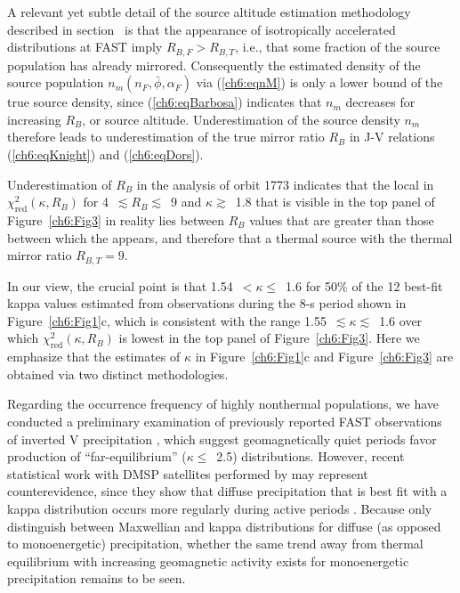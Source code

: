   A relevant yet subtle detail of the source altitude estimation methodology
  described in section~\label{ssSourceAlt} is that the appearance of
  isotropically accelerated distributions at FAST imply $R_{B,F} > R_{B,T}$,
  i.e., that some fraction of the source population has already
  mirrored. Consequently the estimated density of the source population
  $n_m ( n_F, \bar{\phi}, \alpha_F )$ via (\ref{ch6:eqnM}) is only a lower bound
  of the true source density, since (\ref{ch6:eqBarbosa}) indicates that $n_m$
  decreases for increasing $R_B$, or source altitude. Underestimation of the
  source density $n_m$ therefore leads to underestimation of the true mirror
  ratio $R_B$ in J-V relations (\ref{ch6:eqKnight}) and (\ref{ch6:eqDors}).

  Underestimation of $R_B$ in the analysis of orbit 1773 indicates that the
  local \DIFdelbegin {}\DIFdelend \DIFaddbegin {}\DIFaddend in $\chi^2_{\mathrm{red}} (\kappa, R_B)$ for
  4~$\lesssim R_B \lesssim$~9 and $\kappa \gtrsim$~1.8 that is visible in the
  top panel of Figure~\ref{ch6:Fig3} in reality lies between $R_B$ values that
  are greater than those between which the \DIFdelbegin {}\DIFdelend \DIFaddbegin {}\DIFaddend appears, and
  therefore that \DIFdelbegin {}\DIFdelend a thermal source \DIFdelbegin {}\DIFdelend \DIFaddbegin {}\DIFaddend with the thermal mirror ratio
  $R_{B,T} = 9$\DIFdelbegin {}\DIFdelend .

  In our view, the crucial point is that 1.54~$< \kappa \leq$~1.6 for 50\% of
  the 12 best-fit kappa values estimated from observations during the 8-s period
  shown in Figure~\ref{ch6:Fig1}c, which is consistent with the range
  1.55~$\lesssim \kappa \lesssim$~1.6 over which
  $\chi^2_{\mathrm{red}} (\kappa, R_B)$ is lowest in the top panel of
  Figure~\ref{ch6:Fig3}. Here we emphasize that the estimates of $\kappa$ in
  Figure~\ref{ch6:Fig1}c and Figure~\ref{ch6:Fig3} are obtained via two distinct
  methodologies.

  Regarding the occurrence frequency of highly nonthermal populations, we have
  conducted a preliminary examination of previously reported FAST observations
  of inverted V precipitation
  \citep{McFadden1998a,Carlson2001,Janhunen2001,Dombeck2013}, which suggest
  geomagnetically quiet periods favor production of ``far-equilibrium''
  ($\kappa \leq$~2.5) distributions. However, recent statistical work with DMSP
  satellites performed by \citet{McIntosh2014} may represent counterevidence,
  since they show that diffuse precipitation that is best fit with a kappa
  distribution occurs more regularly during active periods \citep[e.g., Figure~7
  in][]{McIntosh2014}. Because \citet{McIntosh2014} only distinguish between
  Maxwellian and kappa distributions for diffuse (as opposed to monoenergetic)
  precipitation, whether the same trend away from thermal equilibrium with
  increasing geomagnetic activity exists for monoenergetic precipitation remains
  to be seen.

